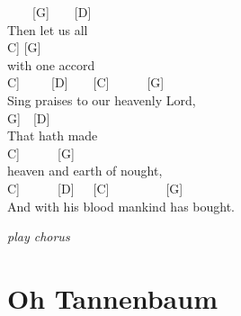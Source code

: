 \documentclass[
  letterpaper,
  a5paper]{memoir}
\begin{document}
~~~~{[}G{]}~~~~{[}D{]}\\
Then let us all\\
\hspace*{0.333em}\hspace*{0.333em}\hspace*{0.333em}\hspace*{0.333em}{[}C{]}
{[}G{]}\\
with one accord~~\\
\hspace*{0.333em}\hspace*{0.333em}\hspace*{0.333em}\hspace*{0.333em}{[}C{]}~~~~~{[}D{]}~~~~{[}C{]}~~~~~~{[}G{]}\\
Sing praises to our heavenly Lord,\\
\hspace*{0.333em}\hspace*{0.333em}\hspace*{0.333em}\hspace*{0.333em}{[}G{]}~~{[}D{]}\\
That hath made\\
\hspace*{0.333em}\hspace*{0.333em}\hspace*{0.333em}\hspace*{0.333em}\hspace*{0.333em}\hspace*{0.333em}\hspace*{0.333em}\hspace*{0.333em}\hspace*{0.333em}\hspace*{0.333em}{[}C{]}~~~~~~{[}G{]}\\
heaven and earth of nought,\\
\hspace*{0.333em}\hspace*{0.333em}\hspace*{0.333em}{[}C{]}~~~~~~{[}D{]}~~~{[}C{]}~~~~~~~~~{[}G{]}\\
And with his blood mankind has bought.

\emph{play chorus}

\hypertarget{oh-tannenbaum}{%
\chapter{Oh Tannenbaum}\label{oh-tannenbaum}}
\end{document}
